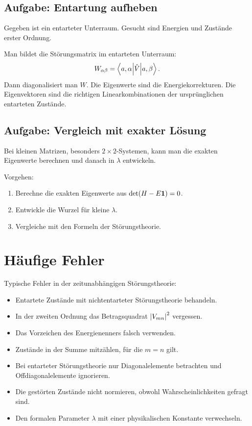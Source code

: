 \subsection{Aufgabe: Entartung aufheben}

Gegeben ist ein entarteter Unterraum. Gesucht sind Energien und Zustände erster Ordnung.

\begin{solutionbox}
Man bildet die Störungsmatrix im entarteten Unterraum:
\[
    W_{\alpha\beta}=\left\langle a,\alpha\middle|\hat V\middle|a,\beta\right\rangle.
\]
Dann diagonalisiert man \(W\). Die Eigenwerte sind die Energiekorrekturen. Die Eigenvektoren sind die richtigen Linearkombinationen der ursprünglichen entarteten Zustände.
\end{solutionbox}

\subsection{Aufgabe: Vergleich mit exakter Lösung}

Bei kleinen Matrizen, besonders \(2\times2\)-Systemen, kann man die exakten Eigenwerte berechnen und danach in \(\lambda\) entwickeln.

\begin{solutionbox}
Vorgehen:
\begin{enumerate}
    \item Berechne die exakten Eigenwerte aus \(\det(H-E\mathbf{1})=0\).
    \item Entwickle die Wurzel für kleine \(\lambda\).
    \item Vergleiche mit den Formeln der Störungstheorie.
\end{enumerate}
\end{solutionbox}

\section{Häufige Fehler}

\begin{notebox}
Typische Fehler in der zeitunabhängigen Störungstheorie:
\begin{itemize}
    \item Entartete Zustände mit nichtentarteter Störungstheorie behandeln.
    \item In der zweiten Ordnung das Betragsquadrat \(\left| V_{mn} \right|^2\) vergessen.
    \item Das Vorzeichen des Energienenners falsch verwenden.
    \item Zustände in der Summe mitzählen, für die \(m=n\) gilt.
    \item Bei entarteter Störungstheorie nur Diagonalelemente betrachten und Offdiagonalelemente ignorieren.
    \item Die gestörten Zustände nicht normieren, obwohl Wahrscheinlichkeiten gefragt sind.
    \item Den formalen Parameter \(\lambda\) mit einer physikalischen Konstante verwechseln.
\end{itemize}
\end{notebox}

